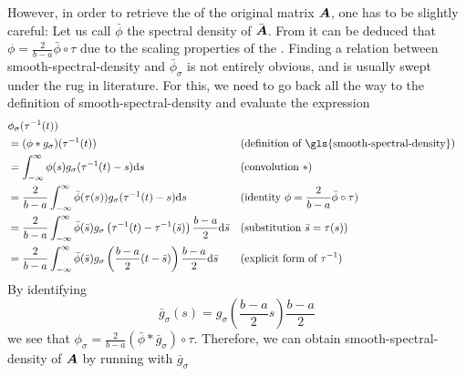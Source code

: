 However, in order to retrieve the 
of the original matrix $\boldsymbol{A}$, one has to be slightly careful:
Let us call $\bar{\phi}$ the spectral density of $\bar{\boldsymbol{A}}$. From 
it can be deduced that $\phi = \frac{2}{b - a}\bar{\phi} \circ \tau$ due to the scaling properties
of the . Finding a relation between \gls{smooth-spectral-density}
and $\bar{\phi}_{\sigma}$ is not entirely obvious, and is usually swept under
the rug in literature. For this, we need to go back all the way to the definition of
\gls{smooth-spectral-density} 
and evaluate the expression
\begin{align*}
    &\phi_{\sigma}(\tau^{-1}(t)) \notag \\
    &= (\phi \ast g_{\sigma})(\tau^{-1}(t)) && \text{(definition of \gls{smooth-spectral-density})} \notag \\
    &= \int_{-\infty}^{\infty} \phi(s) g_{\sigma}(\tau^{-1}(t)-s) \mathrm{d}s && \text{(convolution $\ast$)} \notag \\
    &= \frac{2}{b-a}\int_{-\infty}^{\infty} \bar{\phi}(\tau(s)) g_{\sigma}(\tau^{-1}(t)-s) \mathrm{d}s && \text{(identity $\phi = \frac{2}{b-a}\bar{\phi} \circ \tau$)} \notag \\
    &= \frac{2}{b-a}\int_{-\infty}^{\infty} \bar{\phi}(\bar{s}) g_{\sigma}\left(\tau^{-1}(t)-\tau^{-1}(\bar{s})\right) \frac{b-a}{2} \mathrm{d}\bar{s} && \text{(substitution $\bar{s} = \tau(s)$)} \notag \\
    &= \frac{2}{b-a}\int_{-\infty}^{\infty} \bar{\phi}(\bar{s}) g_{\sigma}\left(\frac{b-a}{2}(t - \bar{s})\right) \frac{b-a}{2} \mathrm{d}\bar{s} && \text{(explicit form of $\tau^{-1}$)}
\end{align*}
By identifying
\begin{equation}
    \bar{g}_{\sigma}(s) = g_{\sigma}\left(\frac{b-a}{2}s\right) \frac{b-a}{2}
\end{equation}
we see that $\phi_{\sigma}= \frac{2}{b-a}(\bar{\phi} \ast \bar{g}_{\sigma}) \circ \tau$.
Therefore, we can obtain \gls{smooth-spectral-density} of $\boldsymbol{A}$ by running
 with $\bar{g}_{\sigma}$
